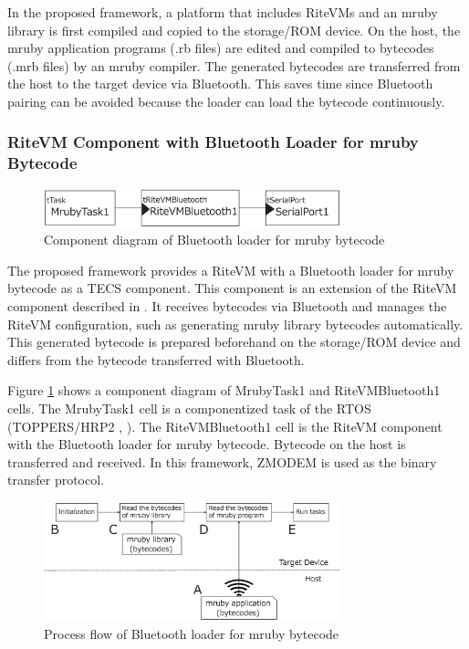 \documentclass{sig-alternate-05-2015}
\begin{document}
In the proposed framework, a platform that includes RiteVMs and an mruby library is first compiled and copied to the storage/ROM device.
On the host, the mruby application programs (.rb files) are edited and compiled to bytecodes (.mrb files) by an mruby compiler.
The generated bytecodes are transferred from the host to the target device via Bluetooth.
This saves time since Bluetooth pairing can be avoided because the loader can load the bytecode continuously.

\subsubsection{RiteVM Component with Bluetooth Loader for mruby Bytecode}
\begin{figure}[t]
    \centering
    \includegraphics[width=8.6cm,clip]{figure/component_bluetooth.eps}
    \vspace{0.5mm}
\caption{Component diagram of Bluetooth loader for mruby bytecode}
    \vspace{1mm}
\label{fig:component_bluetooth}
\end{figure}
The proposed framework provides a RiteVM with a Bluetooth loader for mruby bytecode as a TECS component.
This component is an extension of the RiteVM component described in \cite{par:mrubyonTECS}.
It receives bytecodes via Bluetooth and manages the RiteVM configuration, such as generating mruby library bytecodes automatically.
This generated bytecode is prepared beforehand on the storage/ROM device and differs from the bytecode transferred with Bluetooth.

Figure \ref{fig:component_bluetooth} shows a component diagram of MrubyTask1 and RiteVMBluetooth1 {\myit cell}s.
The MrubyTask1 {\myit cell} is a componentized task of the RTOS (TOPPERS/HRP2 \cite{url:HRP2}, \cite{par:hr-tecs}).
The RiteVMBluetooth1 {\myit cell} is the RiteVM component with the Bluetooth loader for mruby bytecode.
Bytecode on the host is transferred and received.
In this framework, ZMODEM \cite{par:zmodem} is used as the binary transfer protocol.

\begin{figure}[t]
    \centering
    \includegraphics[width=8.6cm,clip]{figure/control_flow.eps}
    \vspace{0.5mm}
\caption{Process flow of Bluetooth loader for mruby bytecode}
    \vspace{1mm}
\label{fig:control_flow}
\end{figure}
\end{document}
